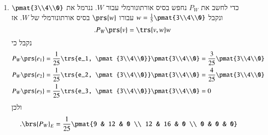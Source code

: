 \documentclass[a4paper,10pt,oneside,openany]{article}
\begin{document}
\begin{solution}
\begin{enumerate}
\item כדי לחשב את
$P_W$
נחפש בסיס אורתונורמלי עבור
$W$.
ננרמל את
$\pmat{3\\4\\0}$
ונקבל
$w = \frac{1}{5} \pmat{3\\4\\0}$
עבורו
$\prs{w}$
בסיס אורתונורמלי של
$W$.
אז
\[\text{.} P_W\prs{v} = \trs{v,w} w\]
נקבל כי
\begin{align*}
P_W\prs{e_1} &= \frac{1}{25} \trs{e_1, \pmat{3\\4\\0}} \pmat{3\\4\\0} = \frac{3}{25} \pmat{3\\4\\0} \\
P_W\prs{e_2} &= \frac{1}{25} \trs{e_2, \pmat{3\\4\\0}} \pmat{3\\4\\0} = \frac{4}{25} \pmat{3\\4\\0} \\
P_W\prs{e_3} &= \frac{1}{25} \trs{e_3, \pmat{3\\4\\0}} \pmat{3\\4\\0} = 0
\end{align*}
ולכן
\begin{align*}
\text{.} \brs{P_W}_E &= \frac{1}{25} \pmat{9 & 12 & 0 \\ 12 & 16 & 0 \\ 0 & 0 & 0}
\end{align*}


\end{enumerate}
\end{solution}
\end{document}
